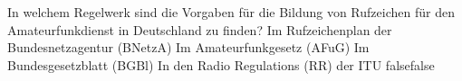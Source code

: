     {In welchem Regelwerk sind die Vorgaben für die Bildung von Rufzeichen für den Amateurfunkdienst in Deutschland zu finden?}
    {Im Rufzeichenplan der Bundesnetzagentur (BNetzA)}
    {Im Amateurfunkgesetz (AFuG)}
    {Im Bundesgesetzblatt (BGBl)}
    {In den Radio Regulations (RR) der ITU}
    {false}{false}